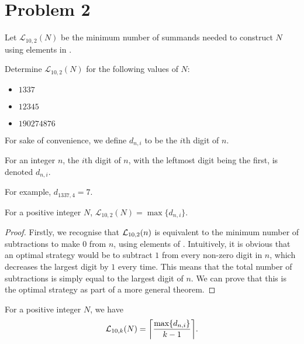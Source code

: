 \section{Problem 2}
\begin{definition}
  Let $\mathcal{L}_{10, 2}(N)$ be the minimum number of summands needed to construct $N$ using elements in \NTen.
\end{definition}
\begin{problem}\label{p2}
Determine $\mathcal{L}_{10, 2}(N)$ for the following values of $N$:
\begin{itemize}
  \item $1337$
  \item  $12345$
  \item  $190274876$
\end{itemize}
\end{problem}
For sake of convenience, we define $d_{n, i}$ to be the $i$th digit of $n$.
\begin{definition}
  For an integer $n$, the $i$th digit of  $n$, with the leftmost digit being the first, is denoted $d_{n, i}$.
\end{definition}
For example, $d_{1337, 4} = 7$.
\begin{theorem}
  For a positive integer $N$, $\mathcal{L}_{10, 2}(N) = \max\{d_{n, i}\}$.
\end{theorem}
\begin{proof}
  Firstly, we recognise that $\mathcal{L}_{10, 2}(n)$ is equivalent to the minimum number of subtractions to make $0$ from $n$, using elements of \NTen. Intuitively, it is obvious that an optimal strategy would be to subtract $1$ from every non-zero digit in $n$, which decreases the largest digit by $1$ every time. This means that the total number of subtractions is simply equal to the largest digit of $n$. We can prove that this is the optimal strategy as part of a more general theorem.
\end{proof}
\begin{theorem}
  For a positive integer $N$, we have \[\mathcal{L}_{10, k}(N) = \ceil*{\frac{\max\{d_{n, i}\}}{k-1}}.\]
\end{theorem}

